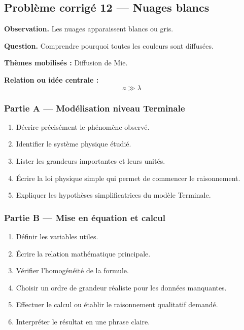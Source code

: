 \documentclass[11pt,a4paper]{article}
\begin{document}
\subsection{Problème corrigé 12 — Nuages blancs}

\begin{exercicebox}
\textbf{Observation.} Les nuages apparaissent blancs ou gris.

\medskip
\textbf{Question.} Comprendre pourquoi toutes les couleurs sont diffusées.

\medskip
\textbf{Thèmes mobilisés :} Diffusion de Mie.

\medskip
\textbf{Relation ou idée centrale :}
\[
a\gg\lambda
\]
\end{exercicebox}

\subsubsection*{Partie A — Modélisation niveau Terminale}

\begin{enumerate}
  \item Décrire précisément le phénomène observé.
  \item Identifier le système physique étudié.
  \item Lister les grandeurs importantes et leurs unités.
  \item Écrire la loi physique simple qui permet de commencer le raisonnement.
  \item Expliquer les hypothèses simplificatrices du modèle Terminale.
\end{enumerate}

\subsubsection*{Partie B — Mise en équation et calcul}

\begin{enumerate}
  \item Définir les variables utiles.
  \item Écrire la relation mathématique principale.
  \item Vérifier l'homogénéité de la formule.
  \item Choisir un ordre de grandeur réaliste pour les données manquantes.
  \item Effectuer le calcul ou établir le raisonnement qualitatif demandé.
  \item Interpréter le résultat en une phrase claire.
\end{enumerate}
\end{document}
